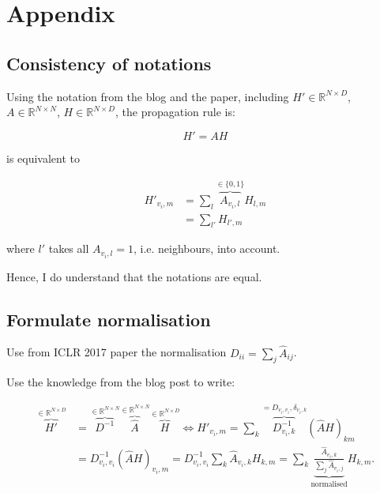 \documentclass[]{article}
\begin{document}
\section{Appendix}

\subsection{Consistency of notations}
\label{sec:consistency}

Using the notation from the blog and the paper, including $H'\in\mathbb{R}^{N\times D}$, $A\in\mathbb{R}^{N\times N}$, $H\in\mathbb{R}^{N\times D}$, the propagation rule is:

\begin{equation}
	H' = A H
\end{equation}

is equivalent to

\begin{equation}
	\begin{split}
		H'_{v_i, m} & = \sum_l \overbrace{A_{v_i, l}}^{\in \{0, 1\}} H_{l, m} \\
		            & = \sum_{l'} H_{l',m}
	\end{split}
\end{equation}

where $l'$ takes all $A_{v_i,l}=1$, i.e. neighbours, into account.

Hence, I do understand that the notations are equal.

\subsection{Formulate normalisation}

Use from ICLR 2017 paper the normalisation $D_{ii} = \sum_j \hat{A}_{ij}$.

Use the knowledge from the blog post to write:

\begin{equation}
	\begin{split}
		\overbrace{H'}^{\in \mathbb{R}^{N\times D}} 
			& = \overbrace{D^{-1}}^{\in\mathbb{R}^{N\times N}} \overbrace{\hat{A}}^{\in \mathbb{R}^{N\times N}} \overbrace{H}^{\in\mathbb{R}^{N\times D}}
			\Leftrightarrow H'_{v_i, m} = \sum_k \overbrace{D^{-1}_{v_i,k}}^{=D_{v_i,v_i}, \delta_{v_i, k}} (\hat{A} H)_{km} \\
		& = D^{-1}_{v_i, v_i} (\hat{A} H)_{v_i, m} = D^{-1}_{v_i, v_i} \sum_k \hat{A}_{v_i, k} H_{k, m} = \sum_k \underbrace{\frac{\hat{A}_{v_i, k}}{\sum_j \hat{A}_{v_i, j}}}_{\text{normalised}} H_{k, m}.
	\end{split}
\end{equation}
\end{document}
